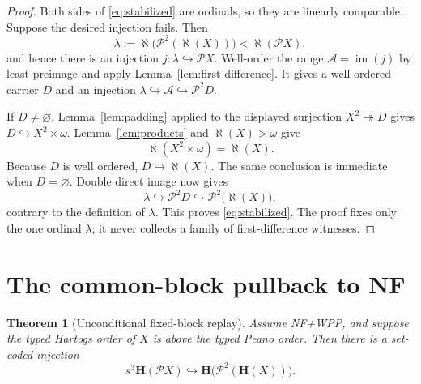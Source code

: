 \documentclass[11pt]{article}
\newtheorem{theorem}{Theorem}[section]
\numberwithin{equation}{section}
\theoremstyle{definition}
\theoremstyle{remark}
\newcommand{\Pow}{\mathcal P}
\newcommand{\inj}{\hookrightarrow}
\newcommand{\surj}{\twoheadrightarrow}
\newcommand{\im}{\operatorname{im}}
\begin{document}
\begin{proof}
Both sides of \eqref{eq:stabilized} are ordinals, so they are linearly
comparable.  Suppose the desired injection fails.  Then
\[
 \lambda:=\aleph\bigl(\Pow^2(\aleph(X))\bigr)
 <\aleph(\Pow X),
\]
and hence there is an injection $j:\lambda\inj\Pow X$.  Well-order the
range $\mathcal A=\im(j)$ by least preimage and apply
Lemma~\ref{lem:first-difference}.  It gives a well-ordered carrier $D$ and
an injection $\lambda\inj\mathcal A\inj\Pow^2D$.

If $D\neq\varnothing$, Lemma~\ref{lem:padding} applied to the displayed
surjection $X^2\surj D$ gives $D\inj X^2\times\omega$.
Lemma~\ref{lem:products} and $\aleph(X)>\omega$ give
\[
 \aleph(X^2\times\omega)=\aleph(X).
\]
Because $D$ is well ordered, $D\inj\aleph(X)$.  The same conclusion is
immediate when $D=\varnothing$.  Double direct image now
gives
\[
 \lambda\inj\Pow^2D
       \inj\Pow^2\bigl(\aleph(X)\bigr),
\]
contrary to the definition of $\lambda$.  This proves
\eqref{eq:stabilized}.  The proof fixes only the one ordinal $\lambda$;
it never collects a family of first-difference witnesses.
\end{proof}

\section{The common-block pullback to NF}
\label{sec:pullback}

\begin{theorem}[Unconditional fixed-block replay]
\label{thm:unconditional-fixed-block-replay}
Assume NF+WPP, and suppose the typed Hartogs order of $X$ is above the
typed Peano order.  Then there is a set-coded injection
\begin{equation}
 s^3\mathbf H(\Pow X)
 \inj
 \mathbf H\bigl(\Pow^2(\mathbf H(X))\bigr).
 \label{eq:common-block-injection}
\end{equation}
\end{theorem}
\end{document}
